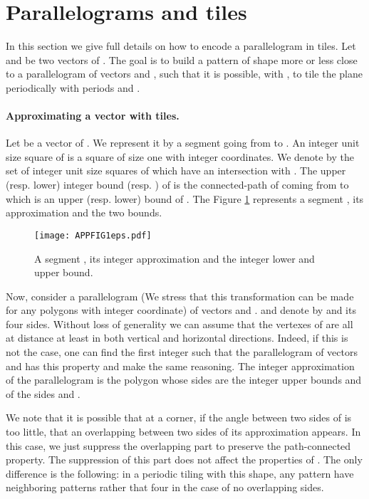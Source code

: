 \documentclass{llncs}
\begin{document}
\section{Parallelograms and tiles}\label{app:tiling}

In this section we give full details on how to encode a parallelogram in tiles. Let  and  be two vectors of .
The goal is to build a pattern   of shape more or less close to a parallelogram of
vectors  and , such that it is possible, with  , to tile the plane periodically with periods 
and .

\smallskip

\paragraph{Approximating a vector with tiles.} Let  be a vector of .
We represent it by a segment  going from  to . An integer unit size square of 
is a square of size one with integer coordinates. We denote by  the set of integer unit size squares of
 which have an intersection with . The upper (resp. lower) integer bound  (resp. ) of  is the connected-path of 
coming from  to  which is an upper (resp. lower) bound of . The Figure \ref{FIGAPP1} represents a segment , its approximation  and the two bounds.

\begin{figure}
\begin{center}
\texttt{[image: APPFIG1eps.pdf]}
\end{center}
\caption{A segment , its integer approximation  and the integer lower and upper bound.}
\label{FIGAPP1}
\end{figure}

Now, consider a parallelogram  (We stress that this transformation can be made for any
polygons with integer coordinate) of vectors  and . and denote by  and  its four sides. Without loss of generality we can assume that the vertexes of  are all at distance at least  in both
vertical and horizontal directions. Indeed, if this is not the case, one can find the first integer  such that the parallelogram of
vectors  and  has this property and make the same reasoning. The integer approximation  of the
parallelogram  is the polygon whose sides are the integer upper bounds  and  of the
sides  and .

We note that it is possible
that at a corner, if the angle between two sides of  is too little, that an overlapping
between two sides of its approximation  appears. In this case, we just suppress the overlapping
part to preserve the path-connected property. The suppression of this part does not affect the properties
of . The only difference is the following: in a periodic tiling with this shape, any pattern
have  neighboring patterns rather that four in the case of no overlapping sides.
\end{document}
